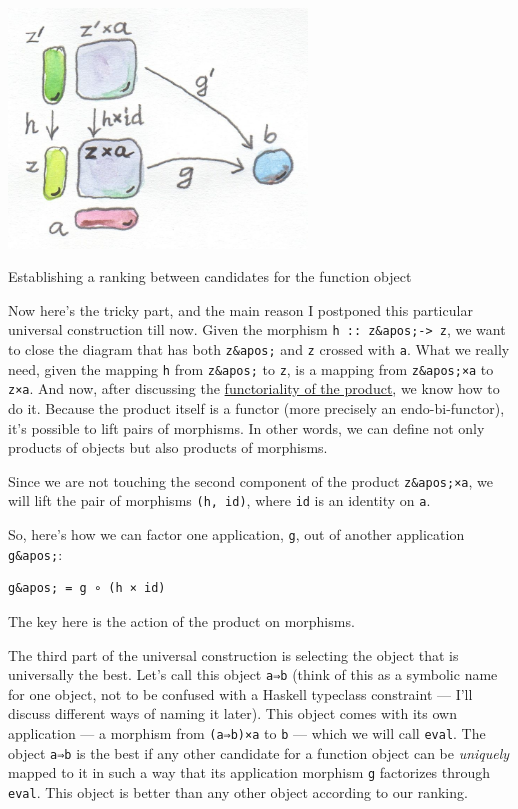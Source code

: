 \hypertarget{attachment_4245}{}
\includegraphics[width=3.12500in]{images/functionranking.jpg}

Establishing a ranking between candidates for the function object

Now here's the tricky part, and the main reason I postponed this
particular universal construction till now. Given the morphism
\texttt{h\ ::\ z\&apos;-\textgreater{}\ z}, we want to close the diagram
that has both \texttt{z\&apos;} and \texttt{z} crossed with \texttt{a}.
What we really need, given the mapping \texttt{h} from \texttt{z\&apos;}
to \texttt{z}, is a mapping from \texttt{z\&apos;×a} to \texttt{z×a}.
And now, after discussing the
\href{https://bartoszmilewski.com/2015/02/03/functoriality/}{functoriality
of the product}, we know how to do it. Because the product itself is a
functor (more precisely an endo-bi-functor), it's possible to lift pairs
of morphisms. In other words, we can define not only products of objects
but also products of morphisms.

Since we are not touching the second component of the product
\texttt{z\&apos;×a}, we will lift the pair of morphisms
\texttt{(h,\ id)}, where \texttt{id} is an identity on \texttt{a}.

So, here's how we can factor one application, \texttt{g}, out of another
application \texttt{g\&apos;}:

\begin{verbatim}
g&apos; = g ∘ (h × id)
\end{verbatim}

The key here is the action of the product on morphisms.

The third part of the universal construction is selecting the object
that is universally the best. Let's call this object \texttt{a⇒b} (think
of this as a symbolic name for one object, not to be confused with a
Haskell typeclass constraint --- I'll discuss different ways of naming
it later). This object comes with its own application --- a morphism
from \texttt{(a⇒b)×a} to \texttt{b} --- which we will call
\texttt{eval}. The object \texttt{a⇒b} is the best if any other
candidate for a function object can be \emph{uniquely} mapped to it in
such a way that its application morphism \texttt{g} factorizes through
\texttt{eval}. This object is better than any other object according to
our ranking.


